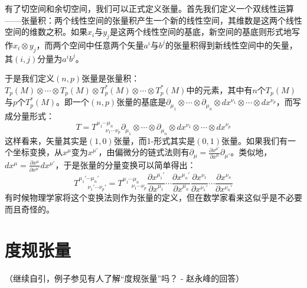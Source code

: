 \documentclass{ctexart}
\begin{document}
有了切空间和余切空间，我们可以正式定义张量。首先我们定义一个双线性运算——张量积：两个线性空间的张量积产生一个新的线性空间，其维数是这两个线性空间的维数之积。如果$x_i$与$y_j$是这两个线性空间的基底，新空间的基底则形式地写作$x_i\otimes y_j$，而两个空间中任意两个矢量$a^i$与$b^j$的张量积得到新线性空间中的矢量，其$(i,j)$分量为$a^ib^j$。

于是我们定义$(n,p)$张量是张量积：$T_p(M)\otimes\cdots\otimes T_p(M)\otimes T_p^*(M)\otimes\cdots\otimes T_p^*(M)$中的元素，其中有$n$个$T_p(M)$与$p$个$T_p^*(M)$。即一个$(n,p)$张量的基底是$\partial_{\mu_1}\otimes\cdots\otimes\partial_{\mu_n}\otimes dx^{\nu_1}\otimes\cdots\otimes dx^{\nu_p}$，而写成分量形式：
\begin{equation}
T=T^{\mu_1\cdots\mu_n}_{\ \ \ \ \ \ \ \nu_1\cdots\nu_p}\partial_{\mu_1}\otimes\cdots\otimes\partial_{\mu_n}\otimes dx^{\nu_1}\otimes\cdots\otimes dx^{\nu_p}
\end{equation}
这样看来，矢量其实是$(1,0)$张量，而1-形式其实是$(0,1)$张量。如果我们有一个坐标变换，从$x^\mu$变为$x^{\mu'}$，由偏微分的链式法则有$\partial_\mu=\frac{\partial x^{\mu'}}{\partial x^\mu}\partial_{\mu'}$。类似地，$dx^\mu=\frac{\partial x^\mu}{\partial x^{\mu'}}dx^{\mu'}$，于是张量的分量变换可以简单得出：
\begin{equation}
T^{\mu_1'\cdots\mu_n'}_{\ \ \ \ \ \ \ \nu_1'\cdots\nu_p'}=T^{\mu_1\cdots\mu_n}_{\ \ \ \ \ \ \ \nu_1\cdots\nu_p}\frac{\partial x^{\mu_1'}}{\partial x^{\mu_1}}\cdots\frac{\partial x^{\mu_n'}}{\partial x^{\mu_n}}\frac{\partial x^{\nu_1}}{\partial x^{\nu_1'}}\cdots\frac{\partial x^{\nu_n}}{\partial x^{\nu_n'}}
\end{equation}
有时候物理学家将这个变换法则作为张量的定义，但在数学家看来这似乎是不必要而且奇怪的。

\section{度规张量}
（继续自引，例子参见有人了解“度规张量”吗？ - 赵永峰的回答）
\end{document}
